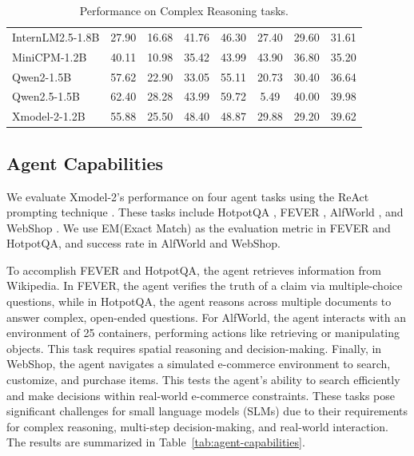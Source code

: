 \documentclass{article}
\newcommand{\llm}{Xmodel-2\xspace}
\begin{document}
\begin{table}[ht]
\begin{tabular}{lccccccc}
    \rowcolor{darkgreen!20}
    InternLM2.5-1.8B\xspace  &27.90&16.68&41.76&46.30&27.40&29.60&31.61 \\
    \rowcolor{darkgreen!20}
    MiniCPM-1.2B\xspace  &40.11&10.98&35.42&43.99&43.90&36.80&35.20 \\
    \rowcolor{darkgreen!20}
    Qwen2-1.5B\xspace &57.62&22.90&33.05&55.11&20.73&30.40&36.64 \\
    \rowcolor{darkred!20}
    Qwen2.5-1.5B\xspace &62.40&28.28&43.99&59.72&5.49&40.00&39.98 \\
    \midrule
    \rowcolor{xdcolor!20}
    \llm-1.2B\xspace    &55.88&25.50&48.40&48.87&29.88&29.20&39.62 \\
    \bottomrule
  \end{tabular}
  \newline
  \caption{Performance on Complex Reasoning tasks.}
  \label{tab:complex-reasoning}
\end{table}



 \subsection{Agent Capabilities}
We evaluate \llm's performance on four agent tasks using the ReAct prompting technique \citep{yao2023react}. These tasks include HotpotQA \citep{yang2018hotpotqa}, FEVER \citep{thorne2018fever}, AlfWorld \citep{shridhar2021alfworld}, and WebShop \citep{yao2023webshop}. We use EM(Exact Match) as the evaluation metric in FEVER and HotpotQA, and success rate in AlfWorld and WebShop.

To accomplish FEVER\citep{thorne2018fever} and HotpotQA\citep{yang2018hotpotqa}, the agent retrieves information from Wikipedia. In FEVER, the agent verifies the truth of a claim via multiple-choice questions, while in HotpotQA\citep{yang2018hotpotqa}, the agent reasons across multiple documents to answer complex, open-ended questions.
For AlfWorld\citep{shridhar2021alfworld}, the agent interacts with an environment of 25 containers, performing actions like retrieving or manipulating objects. This task requires spatial reasoning and decision-making.
Finally, in WebShop\citep{yao2023webshop}, the agent navigates a simulated e-commerce environment to search, customize, and purchase items. This tests the agent's ability to search efficiently and make decisions within real-world e-commerce constraints. These tasks pose significant challenges for small language models (SLMs) due to their requirements for complex reasoning, multi-step decision-making, and real-world interaction. The results are summarized in Table~\ref{tab:agent-capabilities}.
\end{document}
